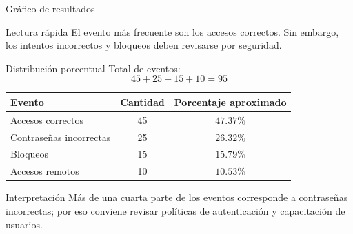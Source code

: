 \documentclass[aspectratio=169]{beamer}
\begin{document}
\begin{frame}[shrink=6]{Gráfico de resultados}
\begin{center}
\end{center}

\begin{block}{Lectura rápida}
El evento más frecuente son los accesos correctos. Sin embargo, los intentos incorrectos y bloqueos deben revisarse por seguridad.
\end{block}
\end{frame}

\begin{frame}[shrink=6]{Distribución porcentual}
Total de eventos:
\[
45+25+15+10=95
\]

\begin{table}
\centering
\begin{tabular}{lcc}
\toprule
Evento & Cantidad & Porcentaje aproximado \\
\midrule
Accesos correctos & 45 & $47.37\%$ \\
Contraseñas incorrectas & 25 & $26.32\%$ \\
Bloqueos & 15 & $15.79\%$ \\
Accesos remotos & 10 & $10.53\%$ \\
\bottomrule
\end{tabular}
\end{table}

\begin{alertblock}{Interpretación}
Más de una cuarta parte de los eventos corresponde a contraseñas incorrectas; por eso conviene revisar políticas de autenticación y capacitación de usuarios.
\end{alertblock}
\end{frame}
\end{document}

